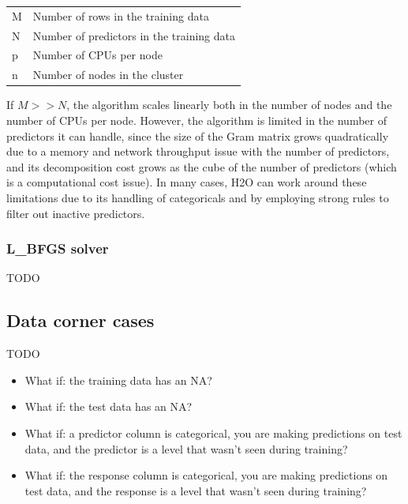 \bigskip

\begin{center}
    \begin{tabular}{ l l }
    M & Number of rows in the training data \\
    N & Number of predictors in the training data \\
    p & Number of CPUs per node \\
    n & Number of nodes in the cluster \\
    \end{tabular}
\end{center}

\bigskip

If $M >> N$, the algorithm scales linearly both in the number of nodes and the number of CPUs per node. However,
the algorithm is limited in the number of predictors it can handle, since the size of the Gram matrix grows
quadratically due to a memory and network throughput issue with the number of predictors, and its decomposition
cost grows as the cube of the number of predictors (which is a computational cost issue). In many cases, H2O can
work around these limitations due to its handling of categoricals and by employing strong rules to filter out
inactive predictors.

\subsubsection{L\_BFGS solver}

TODO

\subsection{Data corner cases}

TODO

\begin{itemize}
\item What if: the training data has an NA?

\item What if: the test data has an NA?

\item What if: a predictor column is categorical, you are making predictions on test data, and the predictor is
a level that wasn't seen during training?

\item What if: the response column is categorical, you are making predictions on test data, and the response is
a level that wasn't seen during training?
\end{itemize}

